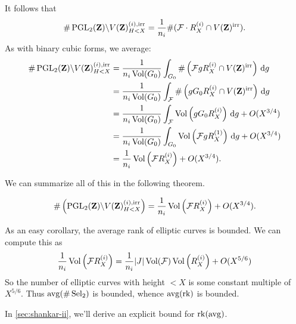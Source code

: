 It follows that 
\[
  \#\operatorname{PGL}_2(\mathbf{Z})\backslash V(\mathbf{Z})_{H<X}^{(i),\mathrm{irr}} = \frac{1}{n_i} \#(\mathcal{F}\cdot R_X^{(i)}\cap V(\mathbf{Z})^\mathrm{irr}) .
\]
As with binary cubic forms, we average: 
\begin{align*}
  \#\operatorname{PGL}_2(\mathbf{Z})\backslash V(\mathbf{Z})_{H<X}^{(i),\mathrm{irr}} 
    &= \frac{1}{n_i \operatorname{Vol}(G_0)} \int_{G_0} \#\left(\mathcal{F} gR_X^{(i)} \cap V(\mathbf{Z})^\mathrm{irr}\right)\, \mathrm{d} g \\
    &= \frac{1}{n_i\operatorname{Vol}(G_0)} \int_{\mathcal{F}} \#\left(g G_0 R_X^{(i)}\cap V(\mathbf{Z})^\mathrm{irr}\right)\, \mathrm{d} g \\
    &= \frac{1}{n_i \operatorname{Vol}(G_0)} \int_{\mathcal{F}} \operatorname{Vol}\left(g G_0 R_X^{(i)}\right)\, \mathrm{d} g + O(X^{3/4}) \\
    &= \frac{1}{n_i\operatorname{Vol}(G_0)} \int_{G_0} \operatorname{Vol}\left(\mathcal{F} g R_X^{(1)}\right)\, \mathrm{d} g + O(X^{3/4}) \\
    &= \frac{1}{n_i} \operatorname{Vol}\left(\mathcal{F} R_X^{(i)}\right) + O(X^{3/4}) .
\end{align*}

We can summarize all of this in the following theorem. 

\begin{theo}
\[
  \#\left(\operatorname{PGL}_2(\mathbf{Z})\backslash V(\mathbf{Z})_{H<X}^{(i),\mathrm{irr}}\right) = \frac{1}{n_i} \operatorname{Vol}\left(\mathcal{F} R_X^{(i)}\right) + O(X^{3/4}) .
\]
\end{theo}

As an easy corollary, the average rank of elliptic curves is bounded. 
We can compute this as  
\[
  \frac{1}{n_i} \operatorname{Vol}\left(\mathcal{F} R_X^{(i)}\right) = \frac{1}{n_i} |J|\operatorname{Vol}(\mathcal{F}) \operatorname{Vol}\left(R_X^{(i)}\right) + O(X^{5/6}) 
\]
So the number of elliptic curves with height $<X$ is some constant multiple of 
$X^{5/6}$. Thus $\operatorname{avg}(\#\operatorname{Sel}_2)$ is bounded, whence $\operatorname{avg}(\operatorname{rk})$ is 
bounded. 

In \autoref{sec:shankar-ii}, we'll derive an explicit bound for 
$\operatorname{rk}(\operatorname{avg})$. 




